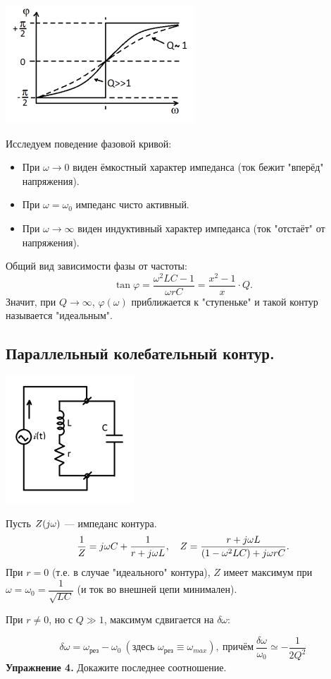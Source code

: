 \documentclass[../main/main.tex]{subfiles}
\begin{document}
\begin{minipage}{6cm}
\centering
\includegraphics[scale=0.7]{../section01/images/phi_o_RLC_lin/phi_o_RLC_lin.png} %
\end{minipage} \hfill   
\begin{minipage}{10cm}
Исследуем поведение фазовой кривой:
\begin{itemize}
\item При $\omega \rightarrow 0$ виден ёмкостный характер импеданса (ток бежит "вперёд"{} напряжения).
\item При $\omega = \omega_0$ импеданс чисто активный.
\item При $\omega \rightarrow \infty$ виден индуктивный характер импеданса (ток "отстаёт"{} от напряжения).
\end{itemize}
\end{minipage}
Общий вид зависимости фазы от частоты:
$$\tan \varphi = \dfrac{\omega^2 LC - 1}{\omega rC} = \dfrac{x^2 - 1}{x} \cdot Q.$$
Значит, при $Q \rightarrow \infty$, $\varphi(\omega)$ приближается к "ступеньке"{} и такой контур называется "идеальным".

\subsection{Параллельный колебательный контур.}

\begin{minipage}{6cm}
\centering
\includegraphics[scale=0.7]{../section01/images/RLC_par/RLC_par.png} %
\end{minipage} \hfill   
\begin{minipage}{10cm}
Пусть $Z(j\omega)$ --- импеданс контура.
$$\dfrac{1}{Z} = j\omega C + \dfrac{1}{r + j\omega L},\quad Z = \dfrac{r + j\omega L}{(1 - \omega^2 LC) + j\omega rC}.$$
При $r = 0$ (т.е. в случае "идеального"{} контура), $Z$ имеет максимум при $\omega = \omega_0 = \dfrac{1}{\sqrt{LC}}$ (и ток во внешней цепи минимален).

При $r \neq 0$, но с $Q \gg 1$, максимум сдвигается на $\delta \omega$:
\end{minipage}
$$\delta \omega = \omega_{\text{рез}} - \omega_0 ~(\text{здесь } \omega_{\text{рез}} \equiv \omega_{max}),~\text{причём}~\boxed{\dfrac{\delta \omega}{\omega_0} \simeq -\dfrac{1}{2 Q^2}}$$
\textbf{Упражнение 4.} Докажите последнее соотношение.
\end{document}
